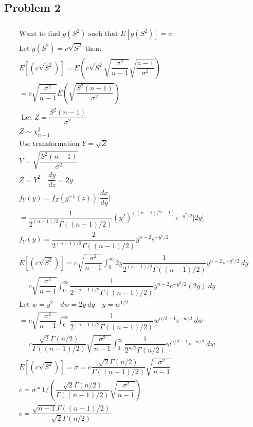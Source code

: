 \documentclass{article}
\begin{document}
\begin{flushleft}
\section*{Problem 2}
\begin{multline*}\\
\text{Want to find } g(S^2) \text{ such that } E[g(S^2)]=\sigma\\ \text{Let }g(S^2)=c\sqrt{S^2} \text{ then:}\\
E[(c\sqrt{S^2})]=E\left(c\sqrt{S^2}\sqrt{\dfrac{\sigma^2}{n-1}}\sqrt{\dfrac{n-1}{\sigma^2}}\right)\\
=c\sqrt{\dfrac{\sigma^2}{n-1}}E\left(\sqrt{\dfrac{S^2(n-1)}{\sigma^2}}\right)\\
\text{ Let } Z = \dfrac{S^2(n-1)}{\sigma^2}\\
Z \sim \chi^2_{n-1}\\
\text{Use transformation } Y=\sqrt{Z}\\
Y=\sqrt{\dfrac{S^2(n-1)}{\sigma^2}}\\
Z=Y^2 \quad \dfrac{dy}{dz}=2y\\
f_Y(y)=f_Z(g^{-1}(z))\bigg|\dfrac{dx}{dy}\bigg|\\
=\dfrac{1}{2^{(n-1)/2}\Gamma((n-1)/2)}(y^2)^{((n-1)/2-1)}e^{-y^2/2}|2y|\\
f_Y(y)=\dfrac{2}{2^{(n-1)/2}\Gamma((n-1)/2)}y^{n-2}e^{-y^2/2}\\
E[(c\sqrt{S^2})]=c\sqrt{\dfrac{\sigma^2}{n-1}}\int_{0}^{\infty}2y \dfrac{1}{2^{(n-1)/2}\Gamma((n-1)/2)}y^{n-2}e^{-y^2/2} \ dy\\
=c\sqrt{\dfrac{\sigma^2}{n-1}}\int_{0}^{\infty} \dfrac{1}{2^{(n-1)/2}\Gamma((n-1)/2)}y^{n-2}e^{-y^2/2} (2y) \ dy\\
\text{Let } w=y^2 \quad dw=2y \ dy \quad y=w^{1/2}\\
=c\sqrt{\dfrac{\sigma^2}{n-1}}\int_{0}^{\infty} \dfrac{1}{2^{(n-1)/2}\Gamma((n-1)/2)}w^{n/2-1}e^{-w/2} \ dw\\
=c\dfrac{\sqrt{2}\Gamma(n/2)}{\Gamma((n-1)/2)}\sqrt{\dfrac{\sigma^2}{n-1}}\int_{0}^{\infty} \dfrac{1}{2^{n/2}\Gamma(n/2)}w^{n/2-1}e^{-w/2} \ dw\\
E[(c\sqrt{S^2})]=\sigma=c\dfrac{\sqrt{2}\Gamma(n/2)}{\Gamma((n-1)/2)}\sqrt{\dfrac{\sigma^2}{n-1}}\\
c=\sigma*1/\left(\dfrac{\sqrt{2}\Gamma(n/2)}{\Gamma((n-1)/2)}\sqrt{\dfrac{\sigma^2}{n-1}}\right)\\
c=\dfrac{\sqrt{n-1}\Gamma((n-1)/2)}{\sqrt{2}\Gamma(n/2)}\\
\end{multline*}

\end{flushleft}
\end{document}
